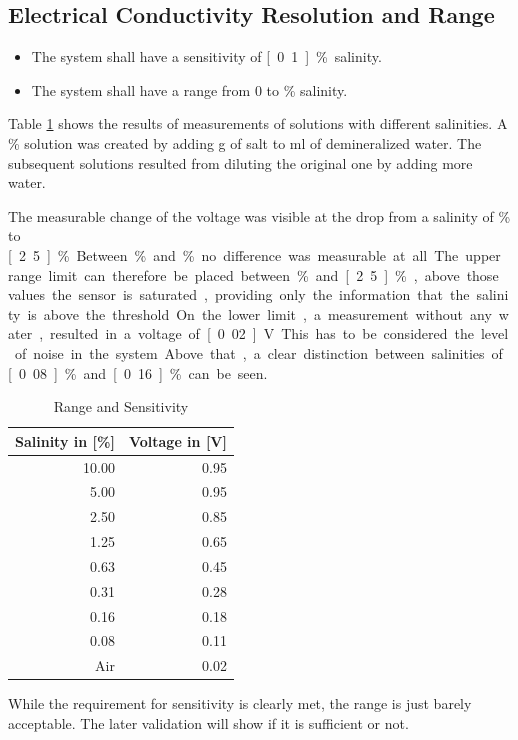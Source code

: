 \subsection{Electrical Conductivity Resolution and Range}


\begin{itemize}
\item The system shall have a sensitivity of  \unit[0.1]{\%} salinity.
\item The system shall have a range from 0 to \unit[5]{\%} salinity.
\end{itemize}

Table \ref{tab:rns} shows the results of measurements of solutions with different salinities. A \unit[10]{\%} solution was created by adding \unit[5]{g} of salt to \unit[100]{ml} of demineralized water. The subsequent solutions resulted from diluting the original one by adding more water.

The measurable change of the voltage was visible at the drop from a salinity of \unit[5]{\%} to \unit[2.5]{\%}. Between \unit[10]{\%} and \unit[5]{\%} no difference was measurable at all. The upper range limit can therefore be placed between \unit[5]{\%} and \unit[2.5]{\%}, above those values the sensor is saturated, providing only the information that the salinity is above the threshold.

On the lower limit, a measurement without any water, resulted in a voltage of \unit[0.02]{V}. This has to be considered the level of noise in the system. Above that, a clear distinction between salinities of \unit[0.08]{\%} and \unit[0.16]{\%} can be seen.

\begin{table}[H]
    \centering

    \caption[Range and Sensitivity]{Range and Sensitivity}
    \label{tab:rns}
    \begin{tabular}{rr}
        	\toprule
        	Salinity in [\%] & Voltage in [V] \tabularnewline
        	\midrule
		10.00 & 0.95 \tabularnewline
        	5.00 & 0.95 \tabularnewline
		2.50 & 0.85 \tabularnewline
		1.25 & 0.65 \tabularnewline
		0.63 & 0.45 \tabularnewline
		0.31 & 0.28 \tabularnewline
		0.16 & 0.18 \tabularnewline
		0.08 & 0.11 \tabularnewline
		Air & 0.02 \tabularnewline
        \bottomrule
    \end{tabular}
\end{table}

While the requirement for sensitivity is clearly met, the range is just barely acceptable. The later validation will show if it is sufficient or not.

